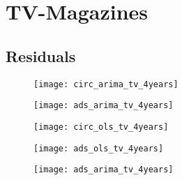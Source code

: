 \documentclass[10pt,a4paper]{scrreprt}
\begin{document}
\chapter{TV-Magazines}

\section{Residuals} 


\begin{figure}[h]
\begin{centering}
  \texttt{[image: circ\_arima\_tv\_4years]}
\end{centering}
\end{figure}


\begin{figure}[h]
\begin{centering}
  \texttt{[image: ads\_arima\_tv\_4years]}
\end{centering}
\end{figure}


\begin{figure}[h]
\begin{centering}
  \texttt{[image: circ\_ols\_tv\_4years]}
\end{centering}
\end{figure}


\begin{figure}[h]
\begin{centering}
  \texttt{[image: ads\_ols\_tv\_4years]}
\end{centering}
\end{figure}


\begin{figure}[h]
\begin{centering}
  \texttt{[image: ads\_arima\_tv\_4years]}
\end{centering}
\end{figure}
\end{document}
